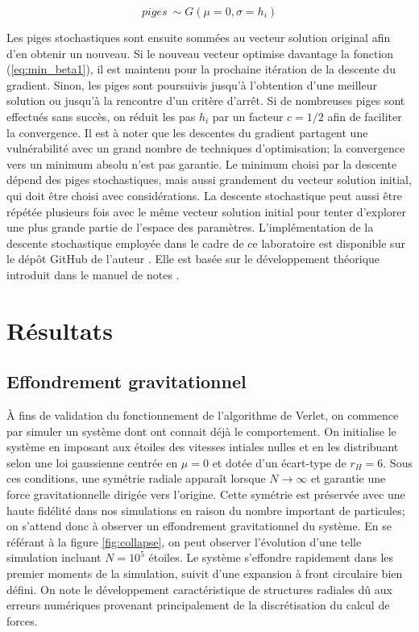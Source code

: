\documentclass{article}
\begin{document}
\begin{equation}\label{eq:pige_normale}
	piges\ \sim G(\mu=0, \sigma=h_i)
\end{equation}

Les piges stochastiques sont ensuite sommées au vecteur solution original afin d'en obtenir un nouveau. Si le nouveau vecteur optimise davantage la fonction (\ref{eq:min_beta1}), il est maintenu pour la prochaine itération de la descente du gradient. Sinon, les piges sont poursuivis jusqu'à l'obtention d'une meilleur solution ou jusqu'à la rencontre d'un critère d'arrêt. Si de nombreuses piges sont effectués sans succès, on réduit les pas $h_i$ par un facteur $c=1/2$ afin de faciliter la convergence. Il est à noter que les descentes du gradient partagent une vulnérabilité avec un grand nombre de techniques d'optimisation; la convergence vers un minimum absolu n'est pas garantie. Le minimum choisi par la descente dépend des piges stochastiques, mais aussi grandement du vecteur solution initial, qui doit être choisi avec considérations. La descente stochastique peut aussi être répétée plusieurs fois avec le même vecteur solution initial pour tenter d'explorer une plus grande partie de l'espace des paramètres. L'implémentation de la descente stochastique employée dans le cadre de ce laboratoire est disponible sur le dépôt GitHub de l'auteur \cite{github}. Elle est basée sur le développement théorique introduit dans le manuel de notes \cite{notes_cours_phy1234}.

\section{Résultats}\label{sec:resultat}

\subsection{Effondrement gravitationnel}\label{subsec:effondrement}

À fins de validation du fonctionnement de l'algorithme de Verlet, on commence par simuler un système dont ont connait déjà le comportement. On initialise le système en imposant aux étoiles des vitesses intiales nulles et en les distribuant selon une loi gaussienne centrée en $\mu=0$ et dotée d'un écart-type de $r_H=6$. Sous ces conditions, une symétrie radiale apparaît lorsque $N \rightarrow \infty$ et garantie une force gravitationnelle dirigée vers l'origine. Cette symétrie est préservée avec une haute fidélité dans nos simulations en raison du nombre important de particules; on s'attend donc à observer un effondrement gravitationnel du système. En se référant à la figure \ref{fig:collapse}, on peut observer l'évolution d'une telle simulation incluant $N=10^5$ étoiles. Le système s'effondre rapidement dans les premier moments de la simulation, suivit d'une expansion à front circulaire bien défini. On note le développement caractéristique de structures radiales dû aux erreurs numériques provenant principalement de la discrétisation du calcul de forces. 
\end{document}
